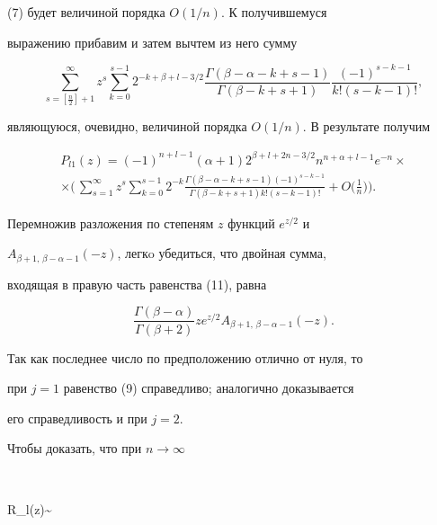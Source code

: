 \begin{pf}
(7) будет величиной порядка $O(1/n)$. К получившемуся 


выражению прибавим и затем вычтем из него сумму 


$$ 


\sum^\infty_{s=\left[\frac{n}{2}\right]+1}z^s 


\sum^{s-1}_{k=0}2^{-k+\beta+l-3/2} 


\frac{\Gamma(\beta-\alpha-k+s-1)}{\Gamma(\beta-k+s+1)} 


\frac{(-1)^{s-k-1}}{k!(s-k-1)!}, 


$$ 


являющуюся, очевидно, величиной порядка $O(1/n)$. В результате получим 


\begin{multline} 


P_{l1}(z)=(-1)^{n+l-1}(\alpha+1) 


2^{\beta+l+2n-3/2}n^{n+\alpha+l-1}e^{-n}\times \\ 


% 


\times\bigg(\,\sum^\infty_{s=1}z^s\sum^{s-1}_{k=0}2^{-k} 


\frac{\Gamma(\beta-\alpha-k+s-1)(-1)^{s-k-1}} 


{\Gamma(\beta-k+s+1)k!(s-k-1)!}+O\bigg(\frac{1}{n}\bigg)\bigg). 


\end{multline} 


Перемножив разложения по степеням $z$ функций $e^{z/2}$ и 


$A_{\beta+1,\,\beta-\alpha-1}(-z)$, легкo убедиться, что двойная сумма,


входящая в правую часть равенства (11), равна 


$$ 


\frac{\Gamma(\beta-\alpha)}{\Gamma(\beta+2)}z e^{z/2} 


A_{\beta+1,\,\beta-\alpha-1}(-z). 


$$ 


Так как последнее число по предположению отлично от нуля, то 


при $j=1$ равенство (9) справедливо; аналогично доказывается 


его справедливость и при $j=2$. 


 


Чтобы доказать, что при $n\to\infty$ 


$$ 


R_l(z)\sim{} 



\end{pf}
